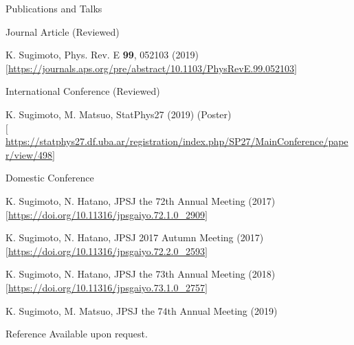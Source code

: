 \documentclass{resume} %
\begin{document}
\begin{rSection}{Publications and Talks}{}{}{}
    \begin{rSubsection}{Journal Article (Reviewed)}{}{}{}
        \item K. Sugimoto, Phys. Rev. E \textbf{99}, 052103 (2019)\\
        $[$\url{https://journals.aps.org/pre/abstract/10.1103/PhysRevE.99.052103}$]$
    \end{rSubsection}

    \begin{rSubsection}{International Conference (Reviewed)}{}{}{}
        \item K. Sugimoto, M. Matsuo, StatPhys27 (2019) (Poster)\\
        $[$\url{https://statphys27.df.uba.ar/registration/index.php/SP27/MainConference/paper/view/498}$]$
    \end{rSubsection}

    \begin{rSubsection}{Domestic Conference}{}{}{}
        \item K. Sugimoto, N. Hatano, JPSJ the 72th Annual Meeting (2017)\\
        $[$\url{https://doi.org/10.11316/jpsgaiyo.72.1.0_2909}$]$
        \item K. Sugimoto, N. Hatano, JPSJ 2017 Autumn Meeting (2017)\\
        $[$\url{https://doi.org/10.11316/jpsgaiyo.72.2.0_2593}$]$
        \item K. Sugimoto, N. Hatano, JPSJ the 73th Annual Meeting (2018)\\
        $[$\url{https://doi.org/10.11316/jpsgaiyo.73.1.0_2757}$]$
        \item K. Sugimoto, M. Matsuo, JPSJ the 74th Annual Meeting (2019)
    \end{rSubsection}
\end{rSection}

\begin{rSection}{Reference}{}{}{}
Available upon request.
\end{rSection}
\end{document}
